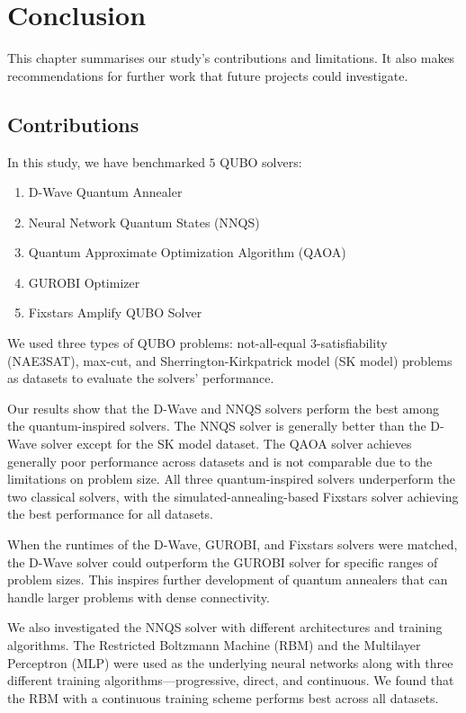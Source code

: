 \chapter{Conclusion}

This chapter summarises our study's contributions and limitations. It also makes recommendations for further work that future projects could investigate.

\section{Contributions}
In this study, we have benchmarked $5$ QUBO solvers:
\begin{enumerate}
    \item D-Wave Quantum Annealer
    \item Neural Network Quantum States (NNQS)
    \item Quantum Approximate Optimization Algorithm (QAOA)
    \item GUROBI Optimizer
    \item Fixstars Amplify QUBO Solver
\end{enumerate}
We used three types of QUBO problems: not-all-equal 3-satisfiability (NAE3SAT), max-cut, and Sherrington-Kirkpatrick model (SK model) problems as datasets to evaluate the solvers' performance.

Our results show that the D-Wave and NNQS solvers perform the best among the quantum-inspired solvers. The NNQS solver is generally better than the D-Wave solver except for the SK model dataset. The QAOA solver achieves generally poor performance across datasets and is not comparable due to the limitations on problem size. All three quantum-inspired solvers underperform the two classical solvers, with the simulated-annealing-based Fixstars solver achieving the best performance for all datasets.

When the runtimes of the D-Wave, GUROBI, and Fixstars solvers were matched, the D-Wave solver could outperform the GUROBI solver for specific ranges of problem sizes. This inspires further development of quantum annealers that can handle larger problems with dense connectivity.

We also investigated the NNQS solver with different architectures and training algorithms. The Restricted Boltzmann Machine (RBM) and the Multilayer Perceptron (MLP) were used as the underlying neural networks along with three different training algorithms---progressive, direct, and continuous. We found that the RBM with a continuous training scheme performs best across all datasets.

